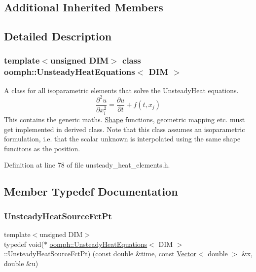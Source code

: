 \subsection*{Additional Inherited Members}


\subsection{Detailed Description}
\subsubsection*{template$<$unsigned D\+IM$>$\newline
class oomph\+::\+Unsteady\+Heat\+Equations$<$ D\+I\+M $>$}

A class for all isoparametric elements that solve the Unsteady\+Heat equations. \[ \frac{\partial^2 u}{\partial x_i^2}=\frac{\partial u}{\partial t}+f(t,x_j) \] This contains the generic maths. \hyperlink{classoomph_1_1Shape}{Shape} functions, geometric mapping etc. must get implemented in derived class. Note that this class assumes an isoparametric formulation, i.\+e. that the scalar unknown is interpolated using the same shape funcitons as the position. 

Definition at line 78 of file unsteady\+\_\+heat\+\_\+elements.\+h.



\subsection{Member Typedef Documentation}
\mbox{\label{classoomph_1_1UnsteadyHeatEquations_a967135cc2be2cb4b16fe0dc0b4d68a68}} 
\subsubsection{\texorpdfstring{Unsteady\+Heat\+Source\+Fct\+Pt}{UnsteadyHeatSourceFctPt}}
{\footnotesize\ttfamily template$<$unsigned D\+IM$>$ \\
typedef void($\ast$ \hyperlink{classoomph_1_1UnsteadyHeatEquations}{oomph\+::\+Unsteady\+Heat\+Equations}$<$ D\+IM $>$\+::Unsteady\+Heat\+Source\+Fct\+Pt) (const double \&time, const \hyperlink{classoomph_1_1Vector}{Vector}$<$ double $>$ \&x, double \&u)}



